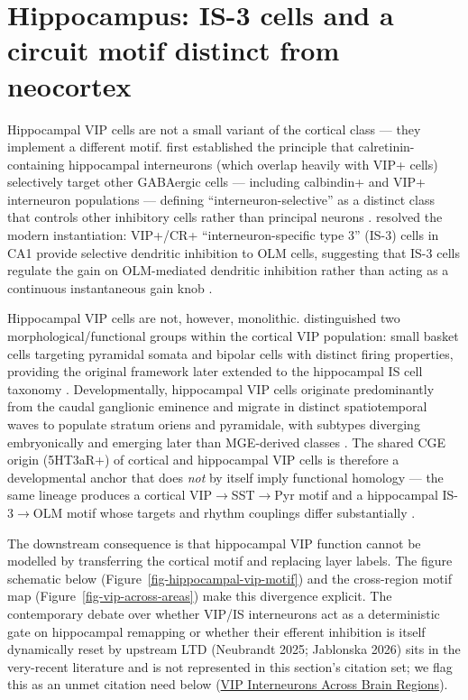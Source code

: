 \documentclass[11pt]{article}
\let\origrightarrow\rightarrow
\def\rightarrow{\ensuremath{\origrightarrow}}
\begin{document}
\section{Hippocampus: IS-3 cells and a circuit motif distinct from neocortex}

Hippocampal VIP cells are not a small variant of the cortical class --- they implement a different motif. \citet{Gulyas1996} first established the principle that calretinin-containing hippocampal interneurons (which overlap heavily with VIP+ cells) selectively target other GABAergic cells --- including calbindin+ and VIP+ interneuron populations --- defining ``interneuron-selective'' as a distinct class that controls other inhibitory cells rather than principal neurons \citep{Gulyas1996}. \citet{Tyan2014} resolved the modern instantiation: VIP+/CR+ ``interneuron-specific type 3'' (IS-3) cells in CA1 provide selective dendritic inhibition to OLM cells, suggesting that IS-3 cells regulate the gain on OLM-mediated dendritic inhibition rather than acting as a continuous instantaneous gain knob \citep{Tyan2014, Gulyas1996}.

Hippocampal VIP cells are not, however, monolithic. \citet{Kawaguchi1996} distinguished two morphological/functional groups within the cortical VIP population: small basket cells targeting pyramidal somata and bipolar cells with distinct firing properties, providing the original framework later extended to the hippocampal IS cell taxonomy \citep{Kawaguchi1996, Kawaguchi1997a}. Developmentally, hippocampal VIP cells originate predominantly from the caudal ganglionic eminence and migrate in distinct spatiotemporal waves to populate stratum oriens and pyramidale, with subtypes diverging embryonically and emerging later than MGE-derived classes \citep{Tricoire2011, Miyoshi2010, Vucurovic2010}. The shared CGE origin (5HT3aR+) of cortical and hippocampal VIP cells is therefore a developmental anchor that does \textit{not} by itself imply functional homology --- the same lineage produces a cortical VIP\rightarrow SST\rightarrow Pyr motif and a hippocampal IS-3\rightarrow OLM motif whose targets and rhythm couplings differ substantially \citep{Tricoire2011, Miyoshi2010, Tyan2014, Gulyas1996}.

The downstream consequence is that hippocampal VIP function cannot be modelled by transferring the cortical motif and replacing layer labels. The figure schematic below (Figure~\ref{fig-hippocampal-vip-motif}) and the cross-region motif map (Figure~\ref{fig-vip-across-areas}) make this divergence explicit. The contemporary debate over whether VIP/IS interneurons act as a deterministic gate on hippocampal remapping or whether their efferent inhibition is itself dynamically reset by upstream LTD (Neubrandt 2025; Jablonska 2026) sits in the very-recent literature and is not represented in this section's citation set; we flag this as an unmet citation need below (\href{/cross-areas}{VIP Interneurons Across Brain Regions}).
\end{document}
